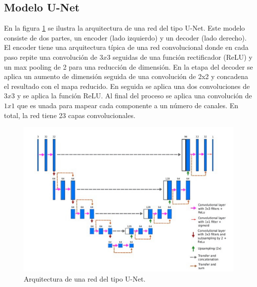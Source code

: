 \subsection{Modelo U-Net}

En la figura \ref{fig:unet} se ilustra la arquitectura de una red del tipo U-Net. Este modelo consiste de dos partes, un encoder (lado izquierdo) y un decoder (lado derecho).  El encoder tiene una arquitectura típica de una red convolucional donde en cada paso repite una convolución de $3x3$ seguidas de una función rectificador (ReLU) y un max pooling de 2 para una reducción de dimensión.  En la etapa del decoder se aplica un aumento de dimensión seguida de una convolución de 2x2 y concadena el resultado con el mapa reducido. En seguida se aplica una dos convoluciones de $3x3$ y se aplica la función ReLU. Al final del proceso se aplica una convolución de $1x1$ que es unada para mapear cada componente a un número de canales. En total, la red tiene 23 capas convolucionales.

\begin{figure}[H]
    \centering
    \includegraphics[width=13cm]{Graphics/unet_model.jpg}
    \caption{Arquitectura de una red del tipo U-Net.}
    \label{fig:unet}
\end{figure}